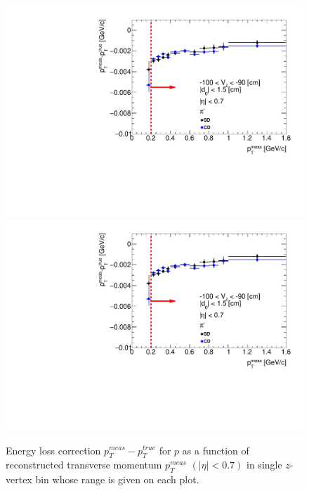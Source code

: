 \begin{figure}[H]
\caption[Energy loss correction for $p$ as a function of reconstructed transverse momentum $p_T^{meas}$.]{Energy loss correction $p_T^{meas}-p_T^{true}$ for $p$ as a function of reconstructed transverse momentum $p_T^{meas}$ $\left(|\eta|<0.7\right)$ in single $z$-vertex bin whose range is given on each plot.}\label{fig:energyLossPrimaryP}
\parbox{0.329\textwidth}{
  \includegraphics[width=\linewidth,page=103]{graphics/energyLoss/energyLoss3D_OnePrtAlso.pdf}\\
  \includegraphics[width=\linewidth,page=106]{graphics/energyLoss/energyLoss3D_OnePrtAlso.pdf}\\
}
\end{figure}
